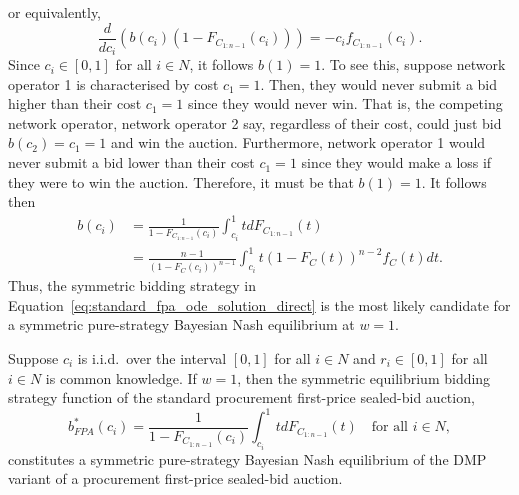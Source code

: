 or equivalently,
\begin{equation}
	\frac{d}{dc_i}(b(c_i)(1 - F_{C_{1:n-1}}(c_i))) = -c_if_{C_{1:n-1}}(c_i).
\end{equation}
Since $c_i\in [0,1]$ for all $i\in N$, it follows $b(1) = 1$. To see this, suppose network operator 1 is characterised by cost $c_1 = 1$. Then, they would never submit a bid higher than their cost $c_1 = 1$ since they would never win. That is, the competing network operator, network operator 2 say, regardless of their cost, could just bid $b(c_2) = c_1 = 1$ and win the auction. Furthermore, network operator 1 would never submit a bid lower than their cost $c_1 = 1$ since they would make a loss if they were to win the auction. Therefore, it must be that $b(1) = 1$. It follows then
\begin{align}
	\label{eq:standard_fpa_ode_solution_direct}
	b(c_i) &= \frac{1}{1 - F_{C_{1:n-1}}(c_i)}\int_{c_i}^{1} tdF_{C_{1:n-1}}(t) \nonumber\\
	&= \frac{n-1}{(1 - F_{C}(c_i))^{n-1}}\int_{c_i}^1 t(1-F_C(t))^{n-2}f_C(t)dt.
\end{align}
Thus, the symmetric bidding strategy in Equation~\eqref{eq:standard_fpa_ode_solution_direct} is the most likely candidate for a symmetric pure-strategy Bayesian Nash equilibrium at $w=1$.
\begin{proposition}
\label{prop:special_case_w_1_direct}
Suppose $c_i$ is i.i.d.~over the interval $[0,1]$ for all $i\in N$ and $r_i \in [0,1]$ for all $i\in N$ is common knowledge. If $w=1$, then the symmetric equilibrium bidding strategy function of the standard procurement first-price sealed-bid auction,
\begin{equation}
	\label{eq:standard_fpa_direct}
	b^*_{FPA}(c_i) = \frac{1}{1 - F_{C_{1:n-1}}(c_i)}\int_{c_i}^{1} tdF_{C_{1:n-1}}(t) \quad\text{for all } i\in N,
\end{equation}
constitutes a symmetric pure-strategy Bayesian Nash equilibrium of the DMP variant of a procurement first-price sealed-bid auction.
\end{proposition}

